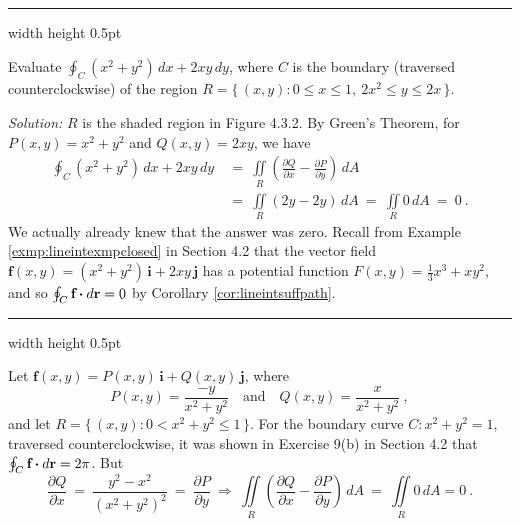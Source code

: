 \medskip
\hrule width \textwidth height 0.5pt
\begin{exmp}\label{exmp:greenexmp}
  Evaluate $\oint_{C} (x^2 + y^2 )\,dx + 2xy\,dy$, where $C$ is the boundary (traversed counterclockwise) of the region
  $R = \lbrace\,(x,y): 0 \le x \le 1,~2x^2 \le y \le 2x \,\rbrace$.

 \piccaption[]{}
 \par\noindent \emph{Solution:} $R$ is the shaded region in Figure 4.3.2. By Green's Theorem, for
 $P(x,y)=x^2 + y^2$ and $Q(x,y)=2xy$, we have
 \begin{align*}
  \oint_C (x^2 + y^2 )\,dx + 2xy\,dy ~&=~ \iint\limits_{R} \left( \frac{\partial Q}{\partial x} -
   \frac{\partial P}{\partial y} \right)\,dA\\
   &=~ \iint\limits_{R} (2y - 2y)\,dA
   ~=~ \iint\limits_{R} 0\,dA ~=~ 0 ~.
 \end{align*}
 We actually already knew that the answer was zero. Recall from Example
 \ref{exmp:lineintexmpclosed} in Section 4.2 that the vector field
 $\mathbf{f}(x,y) = ( x^2 + y^2 )\,\mathbf{i} + 2xy\,\mathbf{j}$ has a potential function
 $F(x,y)=\frac{1}{3}x^3 + xy^2$, and so $\oint_{C} \textbf{f} \bm{\cdot} d\textbf{r} = 0$ by Corollary \ref{cor:lineintsuffpath}.
 \end{exmp}
\hrule width \textwidth height 0.5pt
\begin{exmp}\label{exmp:greenhole}
 Let $\mathbf{f}(x,y) = P(x,y)\,\mathbf{i} + Q(x,y)\,\mathbf{j}$, where
 \begin{displaymath}
  P(x,y) = \frac{-y}{x^2 + y^2} \quad\text{and}\quad Q(x,y) = \frac{x}{x^2 + y^2} ~,
 \end{displaymath}
 and let $R =\lbrace\,(x,y): 0 < x^2 + y^2 \le 1\,\rbrace$. For the boundary curve $C:x^2 + y^2 = 1$, traversed
 counterclockwise, it was shown in Exercise 9(b) in Section 4.2 that $\oint_{C} \textbf{f} \bm{\cdot} d\textbf{r} = 2\pi$. But
 \begin{displaymath}
  \frac{\partial Q}{\partial x} ~=~ \frac{y^2 - x^2}{(x^2 + y^2 )^2} ~=~ \frac{\partial P}{\partial y} ~
  \Rightarrow ~
  \iint\limits_{R} \left( \frac{\partial Q}{\partial x} - \frac{\partial P}{\partial y} \right)\,dA ~=~
  \iint\limits_{R} 0 \,dA = 0~.
 \end{displaymath}
\end{exmp}
